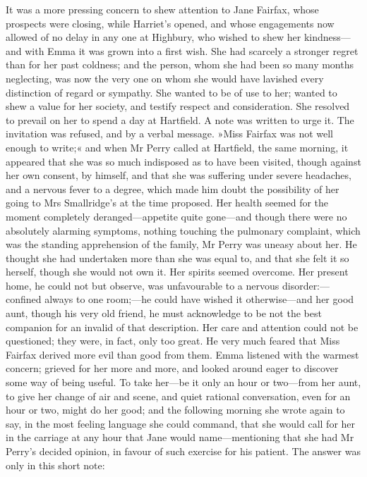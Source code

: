It was a more pressing concern to shew attention to Jane Fairfax, whose prospects were closing, while Harriet's opened, and whose engagements now allowed of no delay in any one at Highbury, who wished to shew her kindness—and with Emma it was grown into a first wish. She had scarcely a stronger regret than for her past coldness; and the person, whom she had been so many months neglecting, was now the very one on whom she would have lavished every distinction of regard or sympathy. She wanted to be of use to her; wanted to shew a value for her society, and testify respect and consideration. She resolved to prevail on her to spend a day at Hartfield. A note was written to urge it. The invitation was refused, and by a verbal message. »Miss Fairfax was not well enough to write;« and when Mr Perry called at Hartfield, the same morning, it appeared that she was so much indisposed as to have been visited, though against her own consent, by himself, and that she was suffering under severe headaches, and a nervous fever to a degree, which made him doubt the possibility of her going to Mrs Smallridge's at the time proposed. Her health seemed for the moment completely deranged—appetite quite gone—and though there were no absolutely alarming symptoms, nothing touching the pulmonary complaint, which was the standing apprehension of the family, Mr Perry was uneasy about her. He thought she had undertaken more than she was equal to, and that she felt it so herself, though she would not own it. Her spirits seemed overcome. Her present home, he could not but observe, was unfavourable to a nervous disorder:—confined always to one room;—he could have wished it otherwise—and her good aunt, though his very old friend, he must acknowledge to be not the best companion for an invalid of that description. Her care and attention could not be questioned; they were, in fact, only too great. He very much feared that Miss Fairfax derived more evil than good from them. Emma listened with the warmest concern; grieved for her more and more, and looked around eager to discover some way of being useful. To take her—be it only an hour or two—from her aunt, to give her change of air and scene, and quiet rational conversation, even for an hour or two, might do her good; and the following morning she wrote again to say, in the most feeling language she could command, that she would call for her in the carriage at any hour that Jane would name—mentioning that she had Mr Perry's decided opinion, in favour of such exercise for his patient. The answer was only in this short note:

